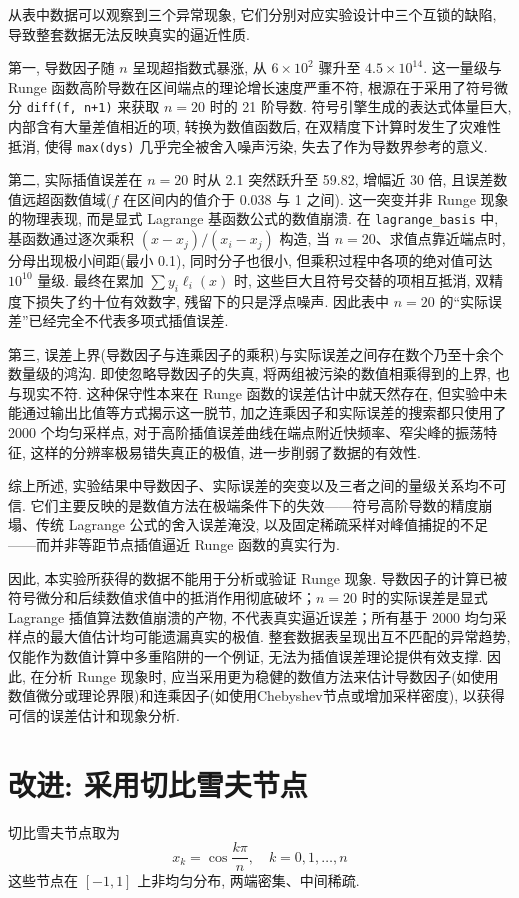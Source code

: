 \documentclass[12pt,a4paper]{ctexart}
\begin{document}
从表中数据可以观察到三个异常现象, 它们分别对应实验设计中三个互锁的缺陷, 导致整套数据无法反映真实的逼近性质. 

第一, 导数因子随 $n$ 呈现超指数式暴涨, 从 $6\times10^{2}$ 骤升至 $4.5\times10^{14}$. 这一量级与 Runge 函数高阶导数在区间端点的理论增长速度严重不符, 根源在于采用了符号微分 \texttt{diff(f, n+1)} 来获取 $n=20$ 时的 21 阶导数. 符号引擎生成的表达式体量巨大, 内部含有大量差值相近的项, 转换为数值函数后, 在双精度下计算时发生了灾难性抵消, 使得 \texttt{max(dys)} 几乎完全被舍入噪声污染, 失去了作为导数界参考的意义. 

第二, 实际插值误差在 $n=20$ 时从 2.1 突然跃升至 59.82, 增幅近 30 倍, 且误差数值远超函数值域($f$ 在区间内的值介于 0.038 与 1 之间). 这一突变并非 Runge 现象的物理表现, 而是显式 Lagrange 基函数公式的数值崩溃. 在 \texttt{lagrange\_basis} 中, 基函数通过逐次乘积 $(x-x_j)/(x_i-x_j)$ 构造, 当 $n=20$、求值点靠近端点时, 分母出现极小间距(最小 0.1), 同时分子也很小, 但乘积过程中各项的绝对值可达 $10^{10}$ 量级. 最终在累加 $\sum y_i\ell_i(x)$ 时, 这些巨大且符号交替的项相互抵消, 双精度下损失了约十位有效数字, 残留下的只是浮点噪声. 因此表中 $n=20$ 的“实际误差”已经完全不代表多项式插值误差. 

第三, 误差上界(导数因子与连乘因子的乘积)与实际误差之间存在数个乃至十余个数量级的鸿沟. 即使忽略导数因子的失真, 将两组被污染的数值相乘得到的上界, 也与现实不符. 这种保守性本来在 Runge 函数的误差估计中就天然存在, 但实验中未能通过输出比值等方式揭示这一脱节, 加之连乘因子和实际误差的搜索都只使用了 2000 个均匀采样点, 对于高阶插值误差曲线在端点附近快频率、窄尖峰的振荡特征, 这样的分辨率极易错失真正的极值, 进一步削弱了数据的有效性. 

综上所述, 实验结果中导数因子、实际误差的突变以及三者之间的量级关系均不可信. 它们主要反映的是数值方法在极端条件下的失效——符号高阶导数的精度崩塌、传统 Lagrange 公式的舍入误差淹没, 以及固定稀疏采样对峰值捕捉的不足——而并非等距节点插值逼近 Runge 函数的真实行为. 

因此, 本实验所获得的数据不能用于分析或验证 Runge 现象. 导数因子的计算已被符号微分和后续数值求值中的抵消作用彻底破坏；$n=20$ 时的实际误差是显式 Lagrange 插值算法数值崩溃的产物, 不代表真实逼近误差；所有基于 2000 均匀采样点的最大值估计均可能遗漏真实的极值. 整套数据表呈现出互不匹配的异常趋势, 仅能作为数值计算中多重陷阱的一个例证, 无法为插值误差理论提供有效支撑. 因此, 在分析 Runge 现象时, 应当采用更为稳健的数值方法来估计导数因子(如使用数值微分或理论界限)和连乘因子(如使用Chebyshev节点或增加采样密度), 以获得可信的误差估计和现象分析.

\section*{改进: 采用切比雪夫节点}
切比雪夫节点取为
\[
x_k = \cos\frac{k\pi}{n}, \quad k=0,1,\dots,n
\]
这些节点在 $[-1,1]$ 上非均匀分布, 两端密集、中间稀疏. 
\end{document}
